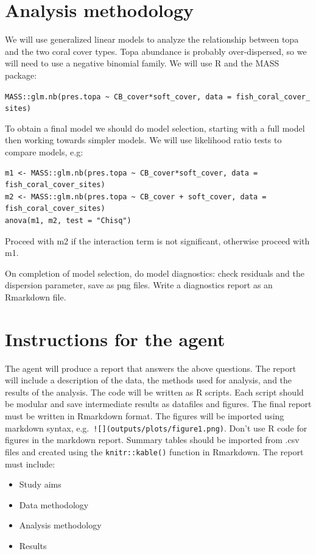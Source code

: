 \documentclass[
  letterpaper,
  DIV=11,
  numbers=noendperiod]{scrreprt}
\providecommand{\tightlist}{%
  \setlength{\itemsep}{0pt}\setlength{\parskip}{0pt}}
\begin{document}
\begin{tcolorbox}
\section{Analysis methodology}\label{analysis-methodology}

We will use generalized linear models to analyze the relationship
between topa and the two coral cover types. Topa abundance is probably
over-dispersed, so we will need to use a negative binomial family. We
will use R and the MASS package:

\texttt{MASS::glm.nb(pres.topa\ \textasciitilde{}\ CB\_cover*soft\_cover,\ data\ =\ fish\_coral\_cover\_sites)}

To obtain a final model we should do model selection, starting with a
full model then working towards simpler models. We will use likelihood
ratio tests to compare models, e.g:

\begin{verbatim}
m1 <- MASS::glm.nb(pres.topa ~ CB_cover*soft_cover, data = fish_coral_cover_sites)
m2 <- MASS::glm.nb(pres.topa ~ CB_cover + soft_cover, data = fish_coral_cover_sites)
anova(m1, m2, test = "Chisq")
\end{verbatim}

Proceed with m2 if the interaction term is not significant, otherwise
proceed with m1.

On completion of model selection, do model diagnostics: check residuals
and the dispersion parameter, save as png files. Write a diagnostics
report as an Rmarkdown file.

\section{Instructions for the agent}\label{instructions-for-the-agent}

The agent will produce a report that answers the above questions. The
report will include a description of the data, the methods used for
analysis, and the results of the analysis. The code will be written as R
scripts. Each script should be modular and save intermediate results as
datafiles and figures. The final report must be written in Rmarkdown
format. The figures will be imported using markdown syntax,
e.g.~\texttt{!{[}{]}(outputs/plots/figure1.png)}. Don't use R code for
figures in the markdown report. Summary tables should be imported from
.csv files and created using the \texttt{knitr::kable()} function in
Rmarkdown. The report must include:

\begin{itemize}
\tightlist
\item
  Study aims
\item
  Data methodology
\item
  Analysis methodology
\item
  Results


\end{itemize}
\end{tcolorbox}
\end{document}
